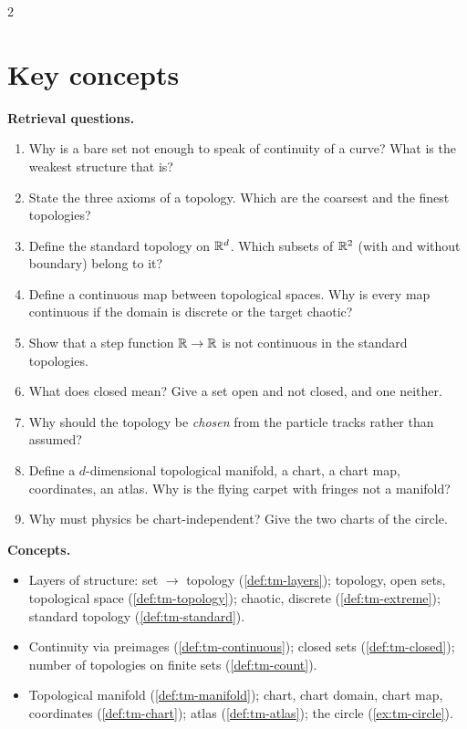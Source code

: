 \begin{paracol}{2}
\section*{Key concepts}
\begin{keyconcepts}
\textbf{Retrieval questions.}
\begin{enumerate}
  \item Why is a bare set not enough to speak of continuity of a curve? What is the weakest structure that is?
  \item State the three axioms of a topology. Which are the coarsest and the finest topologies?
  \item Define the standard topology on $\mathbb{R}^d$. Which subsets of $\mathbb{R}^2$ (with and without boundary) belong to it?
  \item Define a continuous map between topological spaces. Why is every map continuous if the domain is discrete or the
        target chaotic?
  \item Show that a step function $\mathbb{R}\to\mathbb{R}$ is not continuous in the standard topologies.
  \item What does closed mean? Give a set open and not closed, and one neither.
  \item Why should the topology be \emph{chosen} from the particle tracks rather than assumed?
  \item Define a $d$-dimensional topological manifold, a chart, a chart map, coordinates, an atlas. Why is the flying
        carpet with fringes not a manifold?
  \item Why must physics be chart-independent? Give the two charts of the circle.
\end{enumerate}
\textbf{Concepts.}
\begin{itemize}
  \item Layers of structure: set $\to$ topology (\cref{def:tm-layers}); topology, open sets, topological space
        (\cref{def:tm-topology}); chaotic, discrete (\cref{def:tm-extreme}); standard topology (\cref{def:tm-standard}).
  \item Continuity via preimages (\cref{def:tm-continuous}); closed sets (\cref{def:tm-closed}); number of
        topologies on finite sets (\cref{def:tm-count}).
  \item Topological manifold (\cref{def:tm-manifold}); chart, chart domain, chart map, coordinates
        (\cref{def:tm-chart}); atlas (\cref{def:tm-atlas}); the circle (\cref{ex:tm-circle}).
\end{itemize}
\end{keyconcepts}

\flushside
\end{paracol}
